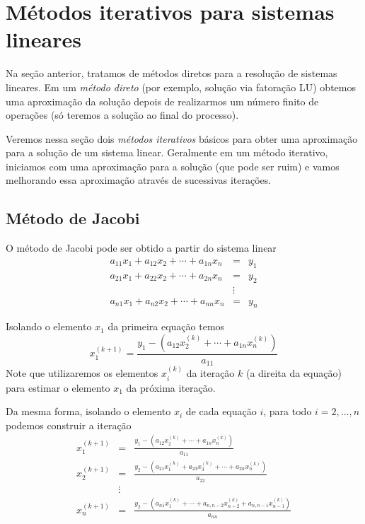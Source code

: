 \section{Métodos iterativos para sistemas lineares}
Na seção anterior, tratamos de métodos diretos para a resolução de sistemas lineares. Em um \emph{método direto} (por exemplo, solução via fatoração LU) obtemos uma aproximação da solução depois de realizarmos um número finito de operações (só teremos a solução ao final do processo).

Veremos nessa seção dois \emph{métodos iterativos} básicos para obter uma aproximação para a solução de um sistema linear. Geralmente em um método iterativo, iniciamos com uma aproximação para a solução (que pode ser ruim) e vamos melhorando essa aproximação através de sucessivas iterações.

\subsection{Método de Jacobi}
O método de Jacobi pode ser obtido a partir do sistema linear
\begin{eqnarray}
a_{11}x_1+a_{12}x_2+\cdots+a_{1n}x_n&=&y_1\\
a_{21}x_1+a_{22}x_2+\cdots+a_{2n}x_n&=&y_2\\
&\vdots&     \\
a_{n1}x_1+a_{n2}x_2+\cdots+a_{nn}x_n&=& y_n
\end{eqnarray}

Isolando o elemento $x_1$ da primeira equação temos
\begin{equation}
x_1^{(k+1)}= \frac{y_1 - \left(a_{12}x_2^{(k)}+\cdots+a_{1n}x_n^{(k)}\right)}{a_{11}}
\end{equation}
Note que utilizaremos os elementos $x_i^{(k)}$ da iteração $k$ (a direita da equação) para estimar o elemento $x_1$ da próxima iteração.

Da mesma forma, isolando o elemento $x_i$ de cada equação $i$, para todo $i=2,...,n$ podemos construir a iteração
\begin{eqnarray}
x_1^{(k+1)}&=&\frac{y_1 - \left(a_{12}x_2^{(k)}+\cdots+a_{1n}x_n^{(k)}\right)}{a_{11}}\\
x_2^{(k+1)}&=&\frac{y_2 - \left(a_{21}x_1^{(k)}+a_{23}x_3^{(k)}+\cdots+a_{2n}x_n^{(k)}\right)}{a_{22}}\\
&\vdots&\\
x_n^{(k+1)}&=&\frac{y_2 - \left(a_{n1}x_1^{(k)}+\cdots+a_{n,n-2}x_{n-2}^{(k)}+a_{n,n-1}x_{n-1}^{(k)}\right)}{a_{nn}}
\end{eqnarray}

